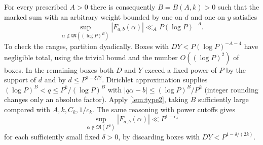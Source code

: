 \documentclass[11pt,letterpaper]{article}
\theoremstyle{definition}
\newcommand{\M}{\mathfrak M}
\begin{document}
For every prescribed $A>0$ there is consequently $B=B(A,k)>0$
such that the marked sum with an arbitrary weight bounded by one on
$d$ and one on $y$ satisfies
\begin{equation}\label{eq:logminor}
 \sup_{\alpha\notin\M((\log P)^B)}|F_{a,b}(\alpha)|
 \ll_A P(\log P)^{-A}.
\end{equation}
To check the ranges, partition dyadically. Boxes with
$DY<P(\log P)^{-A-4}$ have negligible total, using the trivial
bound and the number $O((\log P)^2)$ of boxes. In the remaining boxes
both $D$ and $Y$ exceed a fixed power of $P$ by the support of $d$
and by $d\le P^{1-\xi/2}$. Dirichlet approximation supplies
$(\log P)^B<q\le P^k/(\log P)^B$ with
$|q\alpha-b|\le (\log P)^B/P^k$ (integer rounding changes only an
absolute factor). Apply \cref{lem:type2}, taking $B$ sufficiently
large compared with $A,k,C_k,1/c_k$. The same reasoning with power
cutoffs gives
\begin{equation}\label{eq:polyminor}
 \sup_{\alpha\notin\M(P^\delta)}|F_{a,b}(\alpha)|\ll P^{1-\epsilon_4}
\end{equation}
for each sufficiently small fixed $\delta>0$, by discarding boxes
with $DY<P^{1-\delta/(2k)}$.
\end{document}
